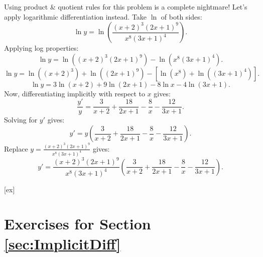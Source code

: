 \begin{solution} 
Using product \& quotient rules for this problem is a complete nightmare!
Let's apply logarithmic differentiation instead.
Take $\ln$ of both sides:
$$\ln y=\ln\left(\frac{(x+2)^3(2x+1)^9}{x^8(3x+1)^4}\right).$$
Applying log properties:
$$\ln y=\ln\left((x+2)^3(2x+1)^9\right)-\ln\left(x^8(3x+1)^4\right).$$
$$\ln y=\ln\left((x+2)^3\right)+\ln\left((2x+1)^9\right)-\left[\ln\left(x^8\right)+\ln\left((3x+1)^4\right)\right].$$
$$\ln y=3\ln(x+2)+9\ln(2x+1)-8\ln x-4\ln(3x+1).$$
Now, differentiating implicitly with respect to $x$ gives:
$$\frac{y'}{y}=\frac{3}{x+2}+\frac{18}{2x+1}-\frac{8}{x}-\frac{12}{3x+1}.$$
Solving for $y'$ gives:
$$y'=y\left(\frac{3}{x+2}+\frac{18}{2x+1}-\frac{8}{x}-\frac{12}{3x+1}\right).$$
Replace $y=\frac{(x+2)^3(2x+1)^9}{x^8(3x+1)^4}$ gives:
$$y'=\frac{(x+2)^3(2x+1)^9}{x^8(3x+1)^4}\left(\frac{3}{x+2}+\frac{18}{2x+1}-\frac{8}{x}-\frac{12}{3x+1}\right).$$
\end{solution}


[ex]
\section*{Exercises for Section \ref{sec:ImplicitDiff}}

